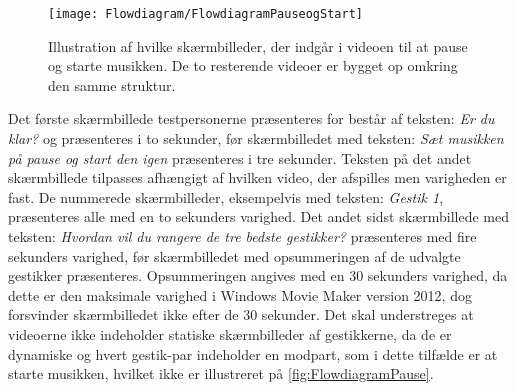 %
\begin{figure}[H]
	\centering
	\texttt{[image: Flowdiagram/FlowdiagramPauseogStart]}
	\caption{Illustration af hvilke skærmbilleder, der indgår i videoen til at pause og starte musikken. De to resterende videoer er bygget op omkring den samme struktur.}
	\label{fig:FlowdiagramPause}
\end{figure}
\noindent
%
Det første skærmbillede testpersonerne præsenteres for består af teksten: \textit{Er du klar?} og præsenteres i to sekunder, før skærmbilledet med teksten: \textit{Sæt musikken på pause og start den igen} præsenteres i tre sekunder. Teksten på det andet skærmbillede tilpasses afhængigt af hvilken video, der afspilles men varigheden er fast. De nummerede skærmbilleder, eksempelvis med teksten: \textit{Gestik 1}, præsenteres alle med en to sekunders varighed. Det andet sidst skærmbillede med teksten: \textit{Hvordan vil du rangere de tre bedste gestikker?} præsenteres med fire sekunders varighed, før skærmbilledet med opsummeringen af de udvalgte gestikker præsenteres. Opsummeringen angives med en 30 sekunders varighed, da dette er den maksimale varighed i Windows Movie Maker version 2012, dog forsvinder skærmbilledet ikke efter de 30 sekunder. Det skal understreges at videoerne ikke indeholder statiske skærmbilleder af gestikkerne, da de er dynamiske og hvert gestik-par indeholder en modpart, som i dette tilfælde er at starte musikken, hvilket ikke er illustreret på \autoref{fig:FlowdiagramPause}.

